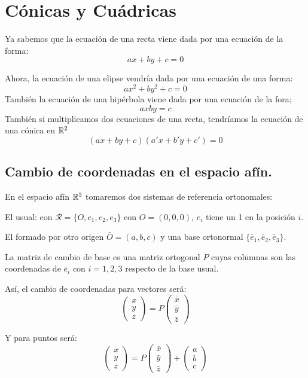 \newpage

\section{Cónicas y Cuádricas}
Ya sabemos que la ecuación de una recta viene dada por una ecuación de la forma:
\[
ax + by +c = 0
\]

Ahora, la ecuación de una elipse vendría dada por una ecuación de una forma:
\[
ax^2 + by^2 + c = 0
\]
También la ecuación de una hipérbola viene dada por una ecuación de la fora;
\[
axby = c
\]
También si multiplicamos dos ecuaciones de una recta, tendríamos la ecuación de una cónica en $\mathbb{R}^2$
\[
(ax + by +c)(a'x+b'y+c') = 0
\]

\subsection{Cambio de coordenadas en el espacio afín.}

En el espacio afín $\mathbb{R}^3$ tomaremos dos sistemas de referencia ortonomales:
\begin{nlist}
	\item El usual: con $\mathcal R = \{O, e_1, e_2, e_3\}$ con $O=(0,0,0)$, $e_i$ tiene un 1 en la posición $i$.
	\item El formado por otro origen $\bar O = (a,b,c)$ y una base ortonormal $\{\bar e_1, \bar e_2, \bar e_3\}$.
\end{nlist}

La matriz de cambio de base es una matriz ortogonal $P$ cuyas columnas son las coordenadas de $\bar e_i$ con $i=1,2,3$ respecto de la base usual.

Así, el cambio de coordenadas para vectores será:
\[
\begin{pmatrix}
x\\
y\\
z
\end{pmatrix}  = P \begin{pmatrix}
\bar x\\
\bar y\\
\bar z
\end{pmatrix}
\]

Y para puntos será:
\[
\begin{pmatrix}
x\\
y\\
z
\end{pmatrix} = P \begin{pmatrix}
\bar x\\
\bar y\\
\bar z
\end{pmatrix}  + \begin{pmatrix}
 a\\
 b\\
 c
\end{pmatrix}
\]





